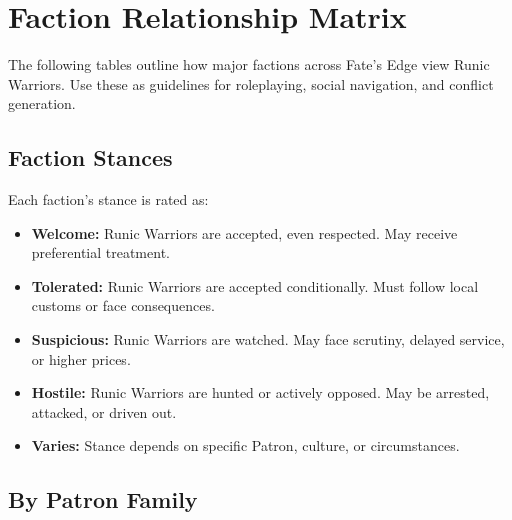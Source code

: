 \section{Faction Relationship Matrix}

The following tables outline how major factions across Fate's Edge view Runic Warriors. Use these as guidelines for roleplaying, social navigation, and conflict generation.

\subsection*{Faction Stances}

Each faction's stance is rated as:

\begin{itemize}
\item \textbf{Welcome:} Runic Warriors are accepted, even respected. May receive preferential treatment.
\item \textbf{Tolerated:} Runic Warriors are accepted conditionally. Must follow local customs or face consequences.
\item \textbf{Suspicious:} Runic Warriors are watched. May face scrutiny, delayed service, or higher prices.
\item \textbf{Hostile:} Runic Warriors are hunted or actively opposed. May be arrested, attacked, or driven out.
\item \textbf{Varies:} Stance depends on specific Patron, culture, or circumstances.
\end{itemize}

\subsection*{By Patron Family}

